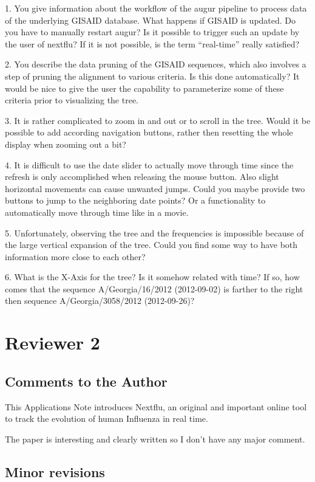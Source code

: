 \documentclass[11pt,oneside,letterpaper]{article}
\begin{document}
1. You give information about the workflow of the augur pipeline to process data of the underlying GISAID database. What happens if GISAID is updated. Do you have to manually restart augur? Is it possible to trigger such an update by the user of nextflu? If it is not possible, is the term ``real-time'' really satisfied?

2. You describe the data pruning of the GISAID sequences, which also involves a step of pruning the alignment to various criteria. Is this done automatically? It would be nice to give the user the capability to parameterize some of these criteria prior to visualizing the tree.

3. It is rather complicated to zoom in and out or to scroll in the tree. Would it be possible to add according navigation buttons, rather then resetting the whole display when zooming out a bit?

4. It is difficult to use the date slider to actually move through time since the refresh is only accomplished when releasing the mouse button. Also slight horizontal movements can cause unwanted jumps. Could you maybe provide two buttons to jump to the neighboring date points? Or a functionality to automatically move through time like in a movie.

5. Unfortunately, observing the tree and the frequencies is impossible because of the large vertical expansion of the tree. Could you find some way to have both information more close to each other?

6. What is the X-Axis for the tree? Is it somehow related with time? If so, how comes that the sequence A/Georgia/16/2012 (2012-09-02) is farther to the right then sequence A/Georgia/3058/2012 (2012-09-26)?

\section*{Reviewer 2}

\subsection*{Comments to the Author}

This Applications Note introduces Nextflu, an original and important online tool to track the evolution of human Influenza in real time.

The paper is interesting and clearly written so I don't have any major comment.

\subsection*{Minor revisions}
\end{document}
